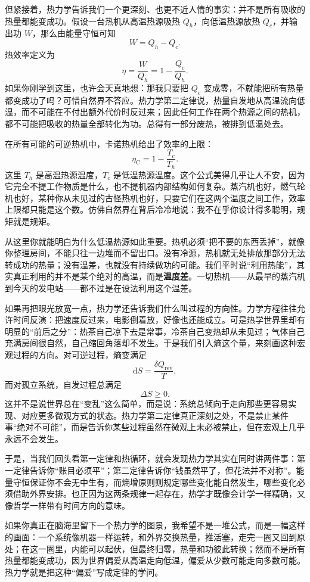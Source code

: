 \documentclass[UTF8]{ctexbook}
\begin{document}
但紧接着，热力学告诉我们一个更深刻、也更不近人情的事实：并不是所有吸收的热量都能变成功。假设一台热机从高温热源吸热 \(Q_h\)，向低温热源放热 \(Q_c\)，并输出功 \(W\)，那么由能量守恒可知
\[
W=Q_h-Q_c.
\]
热效率定义为
\[
\eta=\frac{W}{Q_h}=1-\frac{Q_c}{Q_h}.
\]
如果你刚学到这里，也许会天真地想：那我只要把 \(Q_c\) 变成零，不就能把所有热量都变成功了吗？可惜自然界不答应。热力学第二定律说，热量自发地从高温流向低温，而不可能在不付出额外代价时反过来；因此任何工作在两个热源之间的热机，都不可能把吸收的热量全部转化为功。总得有一部分废热，被排到低温处去。

在所有可能的可逆热机中，卡诺热机给出了效率的上限：
\[
\eta_{\mathrm C}=1-\frac{T_c}{T_h}.
\]
这里 \(T_h\) 是高温热源温度，\(T_c\) 是低温热源温度。这个公式美得几乎让人不安，因为它完全不提工作物质是什么，也不提机器内部结构如何复杂。蒸汽机也好，燃气轮机也好，某种你从未见过的古怪热机也好，只要它们在这两个温度之间工作，效率上限都只能是这个数。仿佛自然界在背后冷冷地说：我不在乎你设计得多聪明，规矩就是规矩。

从这里你就能明白为什么低温热源如此重要。热机必须“把不要的东西丢掉”，就像你整理房间，不能只往一边堆而不留出口。没有冷源，热机就无处排放那部分无法转成功的热量；没有温差，也就没有持续做功的可能。我们平时说“利用热能”，其实真正利用的并不是某个绝对的高温，而是\textbf{温度差}。一切热机——从最早的蒸汽机到今天的发电站——都不过是在设法利用这个温差。

如果再把眼光放宽一点，热力学还告诉我们什么叫过程的方向性。力学方程往往允许时间反演：把速度反过来，电影倒着放，好像也还能成立。可是热学世界里却有明显的“前后之分”：热茶自己凉下去是常事，冷茶自己变热却从未见过；气体自己充满房间很自然，自己缩回角落却不发生。于是我们引入熵这个量，来刻画这种宏观过程的方向。对可逆过程，熵变满足
\[
\mathrm dS=\frac{\delta Q_{\mathrm{rev}}}{T},
\]
而对孤立系统，自发过程总满足
\[
\Delta S\ge 0.
\]
这并不是说世界总在“变乱”这么简单，而是说：系统总倾向于走向那些更容易实现、对应更多微观方式的状态。热力学第二定律真正深刻之处，不是禁止某件事“绝对不可能”，而是告诉你某些过程虽然在微观上未必被禁止，但在宏观上几乎永远不会发生。

于是，当我们回头看第一定律和热循环，就会发现热力学其实在同时讲两件事：第一定律告诉你“账目必须平”；第二定律告诉你“钱虽然平了，但花法并不对称”。能量守恒保证你不会无中生有，而熵增原则则规定哪些变化能自然发生，哪些变化必须借助外界安排。也正因为这两条规律一起存在，热学才既像会计学一样精确，又像哲学一样带有时间方向的意味。

如果你真正在脑海里留下一个热力学的图景，我希望不是一堆公式，而是一幅这样的画面：一个系统像机器一样运转，和外界交换热量，推活塞，走完一圈又回到原处；在这一圈里，内能可以起伏，但最终归零，热量和功彼此转换；然而不是所有热量都能变成功，因为世界偏爱从高温走向低温，偏爱从少数可能走向多数可能。热力学就是把这种“偏爱”写成定律的学问。
\end{document}
